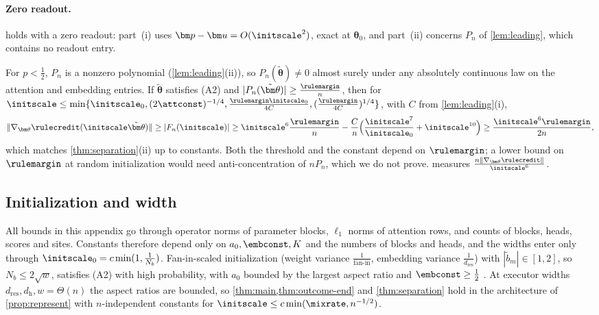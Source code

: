 \paragraph{Zero readout.}\label{rem:zero-readout}  holds with a zero readout: part~(i) uses $\bm p-\bm u=O(\initscale^2)$, exact at $\bm\theta_0$, and part~(ii) concerns $P_n$ of
\cref{lem:leading}, which contains no readout entry.


\begin{remark}
\label{rem:generic-rule}
For $p<\frac{1}{2}$, $P_n$ is a nonzero polynomial (\cref{lem:leading}(ii)), so $P_n(\tilde{\bm\theta})\ne0$ almost surely under any absolutely continuous law on
the attention and embedding entries. If $\tilde{\bm\theta}$ satisfies (A2) and $|P_n(\tilde{\bm\theta})|\ge\frac{\rulemargin}{n}$, then for
$\initscale\le\min\{\initscale_0,(2\attconst)^{-1/4},\frac{\rulemargin\initscale_0}{4C},(\frac{\rulemargin}{4C})^{1/4}\}$, with $C$ from \cref{lem:leading}(i),
\[
 \|\nabla_{\bm\theta}\rulecredit(\initscale\tilde{\bm\theta})\|\ge|F_n(\initscale)|\ge\initscale^6\frac{\rulemargin}{n}-\frac{C}{n}\Bigl(\frac{\initscale^7}{\initscale_0}+\initscale^{10}\Bigr)\ge\frac{\initscale^6\rulemargin}{2n},
\]
which matches \cref{thm:separation}(ii) up to constants. Both the threshold and the constant depend on $\rulemargin$; a lower bound on $\rulemargin$
at random initialization would need anti-concentration of $nP_n$, which we do not prove.  measures $\frac{n\|\nabla_{\bm\theta}\rulecredit\|}{\initscale^6}$.
\end{remark}

\subsection{Initialization and width}
\label{rem:end-width}
All bounds in this appendix go through operator norms of parameter blocks, $\ell_1$ norms of attention rows, and counts of blocks,
heads, scores and sites. Constants therefore depend only on $a_0,\embconst,K$ and the numbers of blocks and heads, and the widths enter only
through $\initscale_0=c\min(1,\frac{1}{N_b})$. Fan-in-scaled initialization (weight variance $\frac{1}{\text{fan-in}}$, embedding variance $\frac{1}{d_{\mathrm{res}}}$) with
$|\tilde b_m|\in[1,2]$, so $N_b\le2\sqrt w$, satisfies (A2) with high probability, with $a_0$ bounded by the largest aspect ratio and $\embconst\ge\frac{1}{2}$
\citep[Thms.~4.4.5, 4.6.1]{vershynin2018high}. At executor widths $d_{\mathrm{res}},d_{\mathrm h},w=\Theta(n)$ the aspect ratios are bounded, so
\cref{thm:main,thm:outcome-end} and \cref{thm:separation} hold in the architecture of \cref{prop:represent} with $n$-independent constants for
$\initscale\le c\min(\mixrate,n^{-1/2})$.


